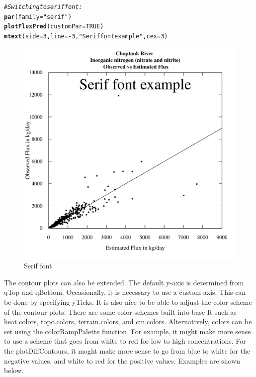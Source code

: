 \documentclass[a4paper,11pt]{article}\usepackage[]{graphicx}\usepackage[]{color}
\makeatletter
\newcommand{\hlnum}[1]{\textcolor[rgb]{0.686,0.059,0.569}{#1}}%
\newcommand{\hlstr}[1]{\textcolor[rgb]{0.192,0.494,0.8}{#1}}%
\newcommand{\hlcom}[1]{\textcolor[rgb]{0.678,0.584,0.686}{\textit{#1}}}%
\newcommand{\hlopt}[1]{\textcolor[rgb]{0,0,0}{#1}}%
\newcommand{\hlstd}[1]{\textcolor[rgb]{0.345,0.345,0.345}{#1}}%
\newcommand{\hlkwc}[1]{\textcolor[rgb]{0.333,0.667,0.333}{#1}}%
\newcommand{\hlkwd}[1]{\textcolor[rgb]{0.737,0.353,0.396}{\textbf{#1}}}%
\newenvironment{kframe}{%
 \def\at@end@of@kframe{}%
 \ifinner\ifhmode%
  \def\at@end@of@kframe{\end{minipage}}%
  \begin{minipage}{\columnwidth}%
 \fi\fi%
 \def\FrameCommand##1{\hskip\@totalleftmargin \hskip-\fboxsep
 \colorbox{shadecolor}{##1}\hskip-\fboxsep
     \hskip-\linewidth \hskip-\@totalleftmargin \hskip\columnwidth}%
 \MakeFramed {\advance\hsize-\width
   \@totalleftmargin\z@ \linewidth\hsize
   \@setminipage}}%
 {\par\unskip\endMakeFramed%
 \at@end@of@kframe}
\newenvironment{knitrout}{}{} %
\makeatother
\begin{document}
\begin{knitrout}
\color{fgcolor}\begin{kframe}
\begin{alltt}
\hlcom{# Switching to serif font:}
\hlkwd{par}\hlstd{(}\hlkwc{family}\hlstd{=}\hlstr{"serif"}\hlstd{)}
\hlkwd{plotFluxPred}\hlstd{(}\hlkwc{customPar}\hlstd{=}\hlnum{TRUE}\hlstd{)}
\hlkwd{mtext}\hlstd{(}\hlkwc{side}\hlstd{=}\hlnum{3}\hlstd{,}\hlkwc{line}\hlstd{=}\hlopt{-}\hlnum{3}\hlstd{,}\hlstr{"Serif font example"}\hlstd{,}\hlkwc{cex}\hlstd{=}\hlnum{3}\hlstd{)}
\end{alltt}
\end{kframe}\begin{figure}[]

\includegraphics[width=1\linewidth,height=1\linewidth]{figure/easyFontChange} \caption[Serif font]{Serif font\label{fig:easyFontChange}}
\end{figure}


\end{knitrout}


The contour plots can also be extended. The default y-axis is determined from qTop and qBottom. Occasionally, it is necessary to use a custom axis. This can be done by specifying yTicks. It is also nice to be able to adjust the color scheme of the contour plots. There are some color schemes built into base R such as heat.colors, topo.colors, terrain.colors, and cm.colors. Alternatively, colors can be set using the colorRampPalette function. For example, it might make more sense to use a scheme that goes from white to red for low to high concentrations. For the plotDiffContours, it moght make more sense to go from blue to white for the negative values, and white to red for the positive values. Examples are shown below.
\end{document}
